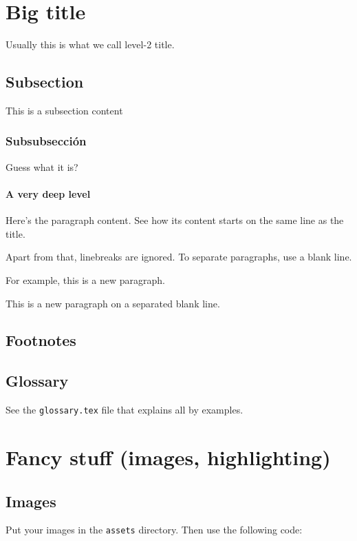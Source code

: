     \section*{Big title}
    Usually this is what we call level-2 title.
    \subsection*{Subsection}
    This is a subsection content
    \subsubsection*{Subsubsección}
    Guess what it is?
    \paragraph*{A very deep level}
    Here's the paragraph content. See how its content starts on the same line as the title.

Apart from that, linebreaks are ignored. To separate paragraphs, use a blank line.

For example, this is a new paragraph.


This is a new paragraph on a separated blank line.

\subsection{Footnotes}


\subsection{Glossary}

See the \texttt{glossary.tex} file that explains all by examples.

\section{Fancy stuff (images, highlighting)}

\subsection{Images}

Put your images in the \texttt{assets} directory. Then use the following code:

